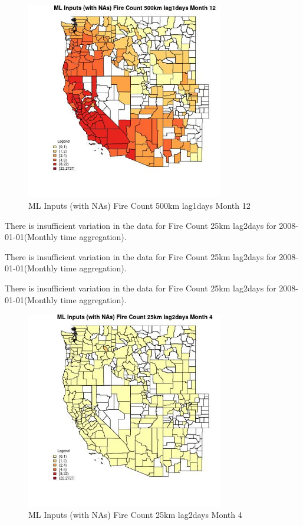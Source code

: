 \begin{figure} 
\centering  
\includegraphics[width=0.77\textwidth]{Code_Outputs/Report_ML_input_PM25_Step4_part_f_de_duplicated_aveswNAs_CountyFire_Count_500km_lag1daysmedianMonth12.jpg} 
\caption{\label{fig:Report_ML_input_PM25_Step4_part_f_de_duplicated_aveswNAsCountyFire_Count_500km_lag1daysmedianMonth12}ML Inputs (with NAs) Fire Count 500km lag1days Month 12} 
\end{figure} 
 

There is insufficient variation in the data for Fire Count 25km lag2days for 2008-01-01(Monthly time aggregation). 
 

There is insufficient variation in the data for Fire Count 25km lag2days for 2008-01-01(Monthly time aggregation). 
 

There is insufficient variation in the data for Fire Count 25km lag2days for 2008-01-01(Monthly time aggregation). 
 

\begin{figure} 
\centering  
\includegraphics[width=0.77\textwidth]{Code_Outputs/Report_ML_input_PM25_Step4_part_f_de_duplicated_aveswNAs_CountyFire_Count_25km_lag2daysmedianMonth4.jpg} 
\caption{\label{fig:Report_ML_input_PM25_Step4_part_f_de_duplicated_aveswNAsCountyFire_Count_25km_lag2daysmedianMonth4}ML Inputs (with NAs) Fire Count 25km lag2days Month 4} 
\end{figure} 
 


